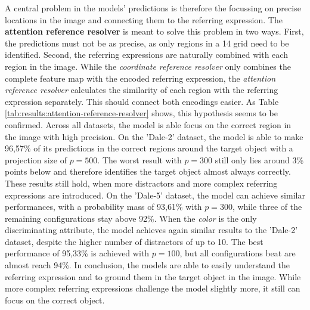 A central problem in the models' predictions is therefore the focussing on precise locations in the image and connecting them to the referring expression.
The \textbf{attention reference resolver} is meant to solve this problem in two ways.
First, the predictions must not be as precise, as only regions in a 14 grid need to be identified.
Second, the referring expressions are naturally combined with each region in the image.
While the \emph{coordinate reference resolver} only combines the complete feature map with the encoded referring expression, the \emph{attention reference resolver} calculates the similarity of each region with the referring expression separately.
This should connect both encodings easier.
As Table \ref{tab:results:attention-reference-resolver} shows, this hypothesis seems to be confirmed.
Across all datasets, the model is able focus on the correct region in the image with high precision.
On the 'Dale-2' dataset, the model is able to make 96,57\% of its predictions in the correct regions around the target object with a projection size of $p=500$.
The worst result with $p=300$ still only lies around 3\% points below and therefore identifies the target object almost always correctly.
These results still hold, when more distractors and more complex referring expressions are introduced.
On the 'Dale-5' dataset, the model can achieve similar performances, with a probability mass of 93,61\% with $p=300$, while three of the remaining configurations stay above 92\%.
When the \emph{color} is the only discriminating attribute, the model achieves again similar results to the 'Dale-2' dataset, despite the higher number of distractors of up to 10.
The best performance of 95,33\% is achieved with $p=100$, but all configurations beat are almost reach 94\%.
In conclusion, the models are able to easily understand the referring expression and to ground them in the target object in the image.
While more complex referring expressions challenge the model slightly more, it still can focus on the correct object.

